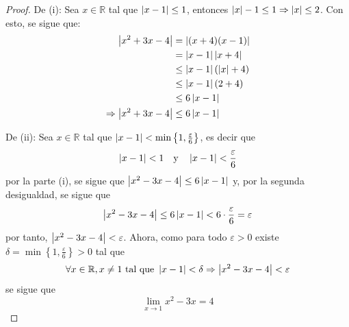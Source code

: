 \documentclass[12pt]{article}
\begin{document}
\begin{enumerate}
    \begin{proof}
        De (i): Sea $x\in\mathbb{R}$ tal que $\left| x-1 \right|\leq 1$, entonces $\left| x \right|-1\leq1\Rightarrow \left| x \right|\leq2$. Con esto, se sigue que:
        \begin{equation*}
            \begin{split}
                \left| x^2+3x-4 \right|&=\left| (x+4)(x-1) \right|\\
                &=\left| x-1 \right|\left| x+4 \right|\\
                &\leq\left| x-1 \right|\left(\left| x \right|+4\right) \\
                &\leq\left| x-1 \right|\left(2+4\right)\\
                &\leq6 \left| x-1 \right|\\
                \Rightarrow \left| x^2+3x-4 \right|&\leq6 \left| x-1 \right|\\ 
            \end{split}
        \end{equation*}

        De (ii): Sea $x\in\mathbb{R}$ tal que $\left| x-1 \right|<\min\left\{1,\frac{\varepsilon}{6} \right\}$, es decir que
        \begin{equation*}
            \left| x-1 \right|<1\quad\textup{y}\quad\left| x-1 \right|<\frac{\varepsilon}{6}
        \end{equation*}
        por la parte (i), se sigue que $\left| x^2-3x-4 \right|\leq 6\left| x-1 \right|$ y, por la segunda desigualdad, se sigue que
        \begin{equation*}
            \left| x^2-3x-4 \right|\leq 6\left| x-1 \right|<6\cdot\frac{\varepsilon}{6}=\varepsilon
        \end{equation*}
        por tanto, $\left| x^2-3x-4 \right|<\varepsilon$. Ahora, como para todo $\varepsilon>0$ existe $\delta=\min\left\{1,\frac{\varepsilon}{6} \right\}>0$ tal que
        \begin{equation*}
            \forall x\in\mathbb{R},x\neq1\textup{ tal que } \left| x-1 \right|<\delta \Rightarrow \left| x^2-3x-4 \right|<\varepsilon
        \end{equation*}
        se sigue que
        \begin{equation*}
            \lim_{x\rightarrow 1}x^2-3x=4
        \end{equation*}
    \end{proof}


\end{enumerate}
\end{document}
